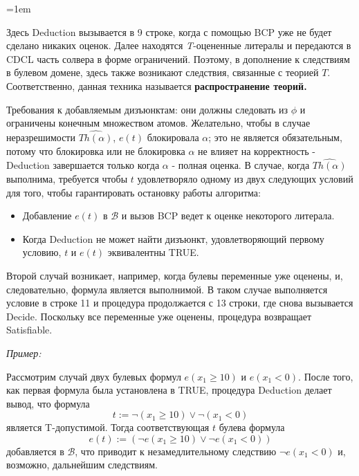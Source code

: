 \documentclass[12pt]{extreport}
\theoremstyle{definiton}
\theoremstyle{definition}
\theoremstyle{definition}
\let\geq\geqslant
\newenvironment{blockquote}{%
  \par%
  \medskip
  \leftskip=1em%
  \noindent}{%
  \par\medskip}
\begin{document}
\begin{blockquote}
{Здесь Deduction вызывается в 9 строке, когда с помощью BCP уже не будет сделано никаких оценок. Далее находятся \textit{T}-оцененные литералы и передаются в CDCL часть солвера в форме ограничений. Поэтому, в дополнение к следствиям в булевом домене, здесь также возникают следствия, связанные с теорией \(T\). Соответственно, данная техника называется \textbf{распространение теорий.} \par 

Требования к добавляемым дизъюнктам: они должны следовать из \(\phi\) и ограничены конечным множеством атомов. Желательно, чтобы в случае неразрешимости \(\hat{Th(\alpha)}\), \(e(t)\) блокировала \(\alpha\); это не является обязательным, потому что блокировка или не блокировка \(\alpha\) не влияет на корректность - Deduction завершается только когда \(\alpha\) - полная оценка. В случае, когда  \(\hat{Th(\alpha)}\) выполнима, требуется чтобы \(t\) удовлетворяло одному из двух следующих условий для того, чтобы гарантировать остановку работы алгоритма:
\begin{itemize}
    \item Добавление \(e(t)\) в \(\bm{\mathcal{B}}\) и вызов BCP ведет к оценке некоторого литерала.
    \item Когда Deduction не может найти дизъюнкт, удовлетворяющий первому условию, \(t\) и \(e(t)\) эквивалентны TRUE.
\end{itemize}

Второй случай возникает, например, когда булевы переменные уже оценены, и, следовательно, формула является выполнимой. В таком случае выполняется условие в строке 11 и процедура продолжается с 13 строки, где снова вызывается Decide. Поскольку все переменные уже оценены, процедура возвращает \glqq Satisfiable\grqq. \\


\par 
\textit{Пример:} \\ \par
Рассмотрим случай двух булевых формул \(e(x_1\geq 10)\) и \(e(x_1<0)\). После того, как первая формула была установлена в TRUE, процедура Deduction делает вывод, что формула
\[t :=\neg{(x_1\geq 10)}\vee\neg{(x_1<0)}\]
является T-допустимой. Тогда соответствующая \(t\) булева формула \[e(t):=(\neg{e(x_1\geq 10)}\vee\neg{e(x_1<0)})\]
добавляется в \(\bm{\mathcal{B}}\), что приводит к незамедлительному следствию \(\neg{e(x_1<0)}\) и, возможно, дальнейшим следствиям.
}

\end{blockquote}
\end{document}

